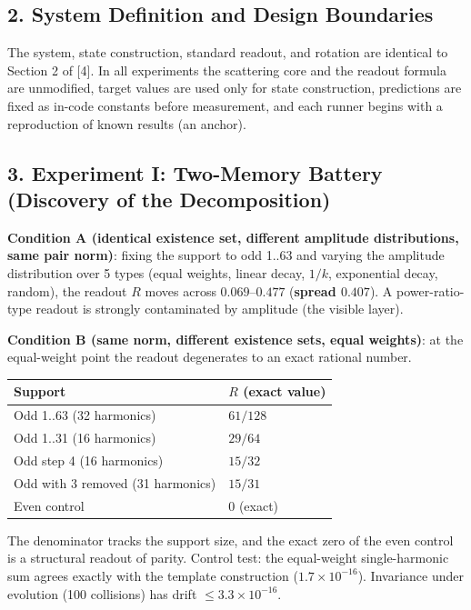 \documentclass[
  a4paper,
]{article}
\newcounter{none} %
\begin{document}
\subsection{2. System Definition and Design
Boundaries}\label{system-definition-and-design-boundaries}

The system, state construction, standard readout, and rotation are
identical to Section 2 of {[}4{]}. In all experiments the scattering
core and the readout formula are unmodified, target values are used only
for state construction, predictions are fixed as in-code constants
before measurement, and each runner begins with a reproduction of known
results (an anchor).

\subsection{3. Experiment I: Two-Memory Battery (Discovery of the
Decomposition)}\label{experiment-i-two-memory-battery-discovery-of-the-decomposition}

\textbf{Condition A (identical existence set, different amplitude
distributions, same pair norm)}: fixing the support to odd 1..63 and
varying the amplitude distribution over 5 types (equal weights, linear
decay, \(1/k\), exponential decay, random), the readout \(R\) moves
across \(0.069\)--\(0.477\) (\textbf{spread \(0.407\)}). A
power-ratio-type readout is strongly contaminated by amplitude (the
visible layer).

\textbf{Condition B (same norm, different existence sets, equal
weights)}: at the equal-weight point the readout degenerates to an exact
rational number.

{\def\LTcaptype{none} %
\begin{longtable}[]{@{}ll@{}}
\toprule\noalign{}
Support & \(R\) (exact value) \\
\midrule\noalign{}
\endhead
\bottomrule\noalign{}
\endlastfoot
Odd 1..63 (32 harmonics) & \(61/128\) \\
Odd 1..31 (16 harmonics) & \(29/64\) \\
Odd step 4 (16 harmonics) & \(15/32\) \\
Odd with 3 removed (31 harmonics) & \(15/31\) \\
Even control & \(0\) (exact) \\
\end{longtable}
}

The denominator tracks the support size, and the exact zero of the even
control is a structural readout of parity. Control test: the
equal-weight single-harmonic sum agrees exactly with the template
construction (\(1.7\times10^{-16}\)). Invariance under evolution (100
collisions) has drift \(\le3.3\times10^{-16}\).
\end{document}
